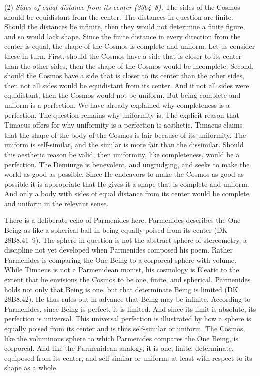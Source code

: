 (2) \emph{Sides of equal distance from its center (33b4--8).} The sides of the Cosmos should be equidistant from the center. The distances in question are finite. Should the distances be infinite, then they would not determine a finite figure, and so would lack shape. Since the finite distance in every direction from the center is equal, the shape of the Cosmos is complete and uniform. Let us consider these in turn. First, should the Cosmos have a side that is closer to its center than the other sides, then the shape of the Cosmos would be incomplete. Second, should the Cosmos have a side that is closer to its center than the other sides, then not all sides would be equidistant from its center. And if not all sides were equidistant, then the Cosmos would not be uniform. But being complete and uniform is a perfection. We have already explained why completeness is a perfection. The question remains why uniformity is. The explicit reason that Timaeus offers for why uniformity is a perfection is aesthetic. Timaeus claims that the shape of the body of the Cosmos is fair because of its uniformity. The uniform is self-similar, and the similar is more fair than the dissimilar. Should this aesthetic reason be valid, then uniformity, like completeness, would be a perfection. The Demiurge is benevolent, and ungrudging, and seeks to make the world as good as possible. Since He endeavors to make the Cosmos as good as possible it is appropriate that He gives it a shape that is complete and uniform. And only a body with sides of equal distance from its center would be complete and uniform in the relevant sense.

There is a deliberate echo of Parmenides here. Parmenides describes the One Being as like a spherical ball in being equally poised from its center (DK 28B8.41--9). The sphere in question is not the abstract sphere of stereometry, a discipline not yet developed when Parmenides composed his poem. Rather Parmenides is comparing the One Being to a corporeal sphere with volume. While Timaeus is not a Parmenidean monist, his cosmology is Eleatic to the extent that he envisions the Cosmos to be one, finite, and spherical. Parmenides holds not only that Being is one, but that determinate Being is limited (DK 28B8.42). He thus rules out in advance that Being may be infinite. According to Parmenides, since Being is perfect, it is limited. And since its limit is absolute, its perfection is universal. This universal perfection is illustrated by how a sphere is equally poised from its center and is thus self-similar or uniform. The Cosmos, like the voluminous sphere to which Parmenides compares the One Being, is corporeal. And like the Parmenidean analogy, it is one, finite, determinate, equiposed from its center, and self-similar or uniform, at least with respect to its shape as a whole.

